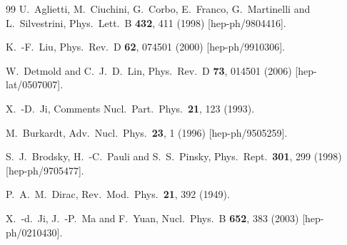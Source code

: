 \begin{thebibliography}{99}
  U.~Aglietti, M.~Ciuchini, G.~Corbo, E.~Franco, G.~Martinelli and L.~Silvestrini,
  Phys.\ Lett.\ B {\bf 432}, 411 (1998)
  [hep-ph/9804416].


  K.~-F.~Liu,
  Phys.\ Rev.\ D {\bf 62}, 074501 (2000)
  [hep-ph/9910306].

  W.~Detmold and C.~J.~D.~Lin,
  Phys.\ Rev.\ D {\bf 73}, 014501 (2006)
  [hep-lat/0507007].



  X.~-D.~Ji,
  Comments Nucl.\ Part.\ Phys.\  {\bf 21}, 123 (1993).

  M.~Burkardt,
  Adv.\ Nucl.\ Phys.\  {\bf 23}, 1 (1996)
  [hep-ph/9505259].

  S.~J.~Brodsky, H.~-C.~Pauli and S.~S.~Pinsky,
  Phys.\ Rept.\  {\bf 301}, 299 (1998)
  [hep-ph/9705477].


  P.~A.~M.~Dirac,
  Rev.\ Mod.\ Phys.\  {\bf 21}, 392 (1949).


  X.~-d.~Ji, J.~-P.~Ma and F.~Yuan,
  Nucl.\ Phys.\ B {\bf 652}, 383 (2003)
  [hep-ph/0210430].


\end{thebibliography}
